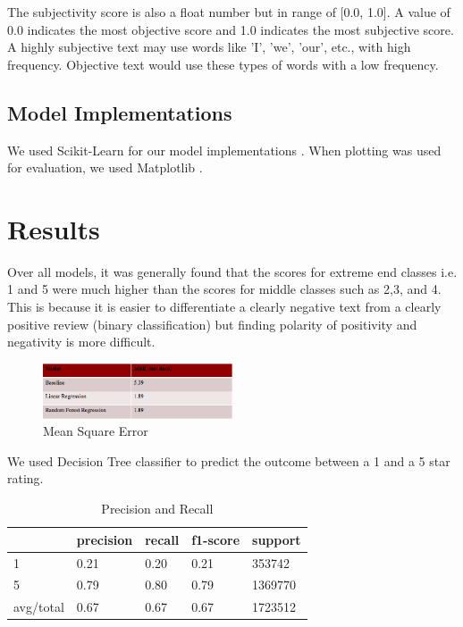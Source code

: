 \documentclass[12pt]{article}
\begin{document}
The subjectivity score is also a float number but in range of [0.0, 1.0]. A value of 0.0
indicates the most objective score and 1.0 indicates the most subjective score. A highly
subjective text may use words like 'I', 'we', 'our', etc., with high frequency. Objective
text would use these types of words with a low frequency.

\subsection{Model Implementations}

We used Scikit-Learn for our model implementations \cite{sklearnl76:online, 32432skl20:online,
  sklearnt25:online}. When plotting was used for evaluation, we used
Matplotlib \cite{Matplotl1:online}. 

\section{Results}

Over all models, it was generally found that the scores for extreme end classes i.e. 1 and 5 
were much higher than the scores for middle classes such as 2,3, and 4. This is because it is 
easier to differentiate a clearly negative text from a clearly positive review (binary classification)
but finding polarity of positivity and negativity is more difficult.

\begin{figure}[h]
  \caption{Mean Square Error}
  \centering
  \includegraphics[width=0.5\textwidth]{MSE}
  \end{figure}
  
  We used Decision Tree classifier to predict the outcome between a 1 and a 5 star rating.
  
  \begin{table}[h]
	\caption{Precision and Recall}
	\centering
	\begin{tabular}{|l|l|l|l|l|}
	\hline
    \textbf{} & \textbf{precision} & \textbf{recall} & \textbf{f1-score} & \textbf{support} \\
	\hline 
	1         & 0.21      & 0.20   & 0.21     & 353742  \\
	\hline 
	5         & 0.79      & 0.80   & 0.79     & 1369770 \\
 	\hline 
 	avg/total & 0.67      & 0.67   & 0.67     & 1723512 \\
 	\hline
\end{tabular}
\end{table}
\end{document}
